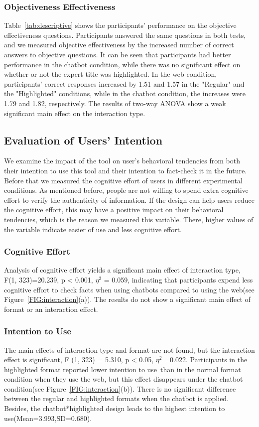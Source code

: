 \subsubsection{ Objectiveness Effectiveness}

Table~\ref{tab:descriptive} shows the participants' performance on the objective effectiveness questions. 
Participants answered the same questions in both tests, and we measured objective effectiveness by the increased number of correct answers to objective questions.
It can be seen that participants had better performance in the chatbot condition, while there was no significant effect on whether or not the expert title was highlighted.
In the web condition, participants' correct responses increased by 1.51 and 1.57 in the "Regular" and the "Highlighted" conditions, while in the chatbot condition, the increases were 1.79 and 1.82, respectively.
The results of two-way ANOVA show a weak significant main effect on the interaction type.

\subsection{Evaluation of Users' Intention}
We examine the impact of the tool on user's behavioral tendencies from both their intention to use this tool and their intention to fact-check it in the future.
Before that we measured the cognitive effort of users in different experimental conditions.
As mentioned before, people are not willing to spend extra cognitive effort to verify the authenticity of information. If the design can help users reduce the cognitive effort, this may have a positive impact on their behavioral tendencies, which is the reason we measured this variable.
There, higher values of the variable indicate easier of use and less cognitive effort.

\subsubsection{Cognitive Effort}
Analysis of cognitive effort yields a significant main effect of interaction type, F(1, 323)=20.239, p < 0.001, $\eta^{2}$ = 0.059, indicating that participants expend less cognitive effort to check facts when using chatbots compared to using the web(see Figure~\ref{FIG:interaction}(a)). 
The results do not show a significant main effect of format or an interaction effect.

\subsubsection{Intention to Use}
The main effects of interaction type and format are not found, but the interaction effect is significant, F (1, 323) = 5.310, p < 0.05, $\eta^{2}$ =0.022. 
Participants in the highlighted format reported lower intention to use than in the normal format condition when they use the web, but this effect disappears under the chatbot condition(see Figure~\ref{FIG:interaction}(b)).
There is no significant difference between the regular and highlighted formats when the chatbot is applied. Besides, the chatbot*highlighted design leads to the highest intention to use(Mean=3.993,SD=0.680).
